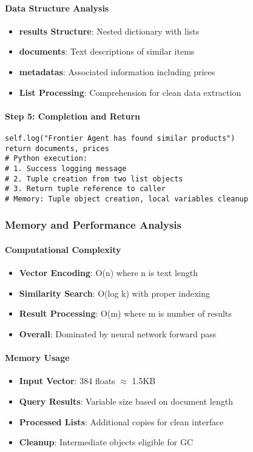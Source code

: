 \paragraph{Data Structure Analysis}
\begin{itemize}
\item \textbf{results Structure}: Nested dictionary with lists
\item \textbf{documents}: Text descriptions of similar items
\item \textbf{metadatas}: Associated information including prices
\item \textbf{List Processing}: Comprehension for clean data extraction
\end{itemize}

\paragraph{Step 5: Completion and Return}
\begin{lstlisting}[caption=Result Return Processing]
self.log("Frontier Agent has found similar products")
return documents, prices
# Python execution:
# 1. Success logging message
# 2. Tuple creation from two list objects
# 3. Return tuple reference to caller
# Memory: Tuple object creation, local variables cleanup
\end{lstlisting}

\subsubsection{Memory and Performance Analysis}

\paragraph{Computational Complexity}
\begin{itemize}
\item \textbf{Vector Encoding}: O(n) where n is text length
\item \textbf{Similarity Search}: O(log k) with proper indexing
\item \textbf{Result Processing}: O(m) where m is number of results
\item \textbf{Overall}: Dominated by neural network forward pass
\end{itemize}

\paragraph{Memory Usage}
\begin{itemize}
\item \textbf{Input Vector}: 384 floats $\approx$ 1.5KB
\item \textbf{Query Results}: Variable size based on document length
\item \textbf{Processed Lists}: Additional copies for clean interface
\item \textbf{Cleanup}: Intermediate objects eligible for GC
\end{itemize}

